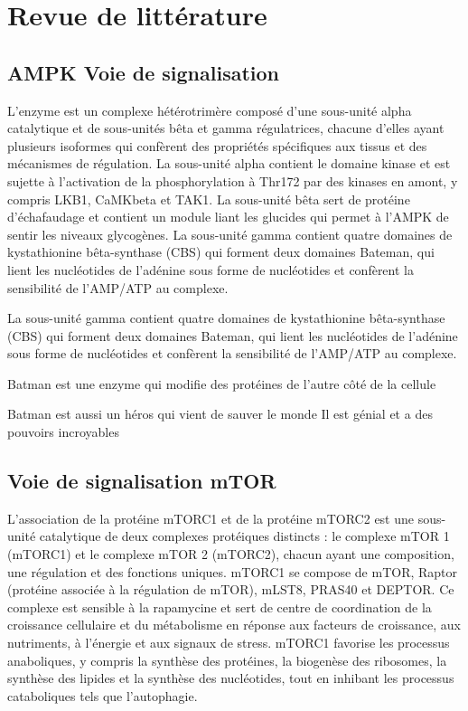 \documentclass[11pt,a4paper]{article}
\begin{document}
\section{Revue de littérature}

\subsection{AMPK Voie de signalisation}

L'enzyme est un complexe hétérotrimère composé d'une sous-unité alpha catalytique et de sous-unités bêta et gamma régulatrices, chacune d'elles ayant plusieurs isoformes qui confèrent des propriétés spécifiques aux tissus et des mécanismes de régulation. La sous-unité alpha contient le domaine kinase et est sujette à l'activation de la phosphorylation à Thr172 par des kinases en amont, y compris LKB1, CaMKbeta et TAK1. La sous-unité bêta sert de protéine d'échafaudage et contient un module liant les glucides qui permet à l'AMPK de sentir les niveaux glycogènes. La sous-unité gamma contient quatre domaines de kystathionine bêta-synthase (CBS) qui forment deux domaines Bateman, qui lient les nucléotides de l'adénine sous forme de nucléotides et confèrent la sensibilité de l'AMP/ATP au complexe.

La sous-unité gamma contient quatre domaines de kystathionine bêta-synthase (CBS) qui forment deux domaines Bateman, qui lient les nucléotides de l'adénine sous forme de nucléotides et confèrent la sensibilité de l'AMP/ATP au complexe.

Batman est une enzyme qui modifie des protéines de l'autre côté de la cellule

Batman est aussi un héros qui vient de sauver le monde
Il est génial et a des pouvoirs incroyables

\subsection{Voie de signalisation mTOR}

L'association de la protéine mTORC1 et de la protéine mTORC2 est une sous-unité catalytique de deux complexes protéiques distincts : le complexe mTOR 1 (mTORC1) et le complexe mTOR 2 (mTORC2), chacun ayant une composition, une régulation et des fonctions uniques. mTORC1 se compose de mTOR, Raptor (protéine associée à la régulation de mTOR), mLST8, PRAS40 et DEPTOR. Ce complexe est sensible à la rapamycine et sert de centre de coordination de la croissance cellulaire et du métabolisme en réponse aux facteurs de croissance, aux nutriments, à l'énergie et aux signaux de stress. mTORC1 favorise les processus anaboliques, y compris la synthèse des protéines, la biogenèse des ribosomes, la synthèse des lipides et la synthèse des nucléotides, tout en inhibant les processus cataboliques tels que l'autophagie.
\end{document}
